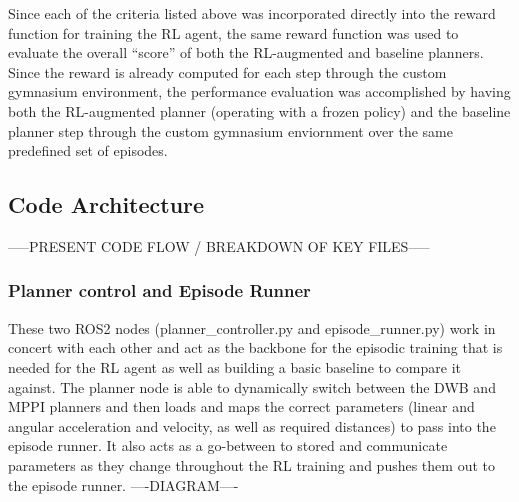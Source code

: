 \documentclass[conference]{IEEEtran}
\begin{document}
    Since each of the criteria listed above was incorporated directly into the reward function for training the RL agent, the same reward function was used to evaluate the overall ``score'' of both the RL-augmented and baseline planners. Since the reward is already computed for each step through the custom gymnasium environment, the performance evaluation was accomplished by having both the RL-augmented planner (operating with a frozen policy) and the baseline planner step through the custom gymnasium enviornment over the same predefined set of episodes.

    \subsection{Code Architecture}
    -----PRESENT CODE FLOW / BREAKDOWN OF KEY FILES-----
        \subsubsection{Planner control and Episode Runner}
        These two ROS2 nodes (planner\_controller.py and episode\_runner.py) work in concert with each other and act as the backbone for the episodic training
        that is needed for the RL agent as well as building a basic baseline to compare it against. The planner node is able to dynamically switch between
        the DWB and MPPI planners and then loads and maps the correct parameters (linear and angular acceleration and velocity, as well as required distances)
        to pass into the episode runner. It also acts as a go-between to stored and communicate parameters as they change throughout the RL training and
        pushes them out to the episode runner.
        ----DIAGRAM----
        
\end{document}

